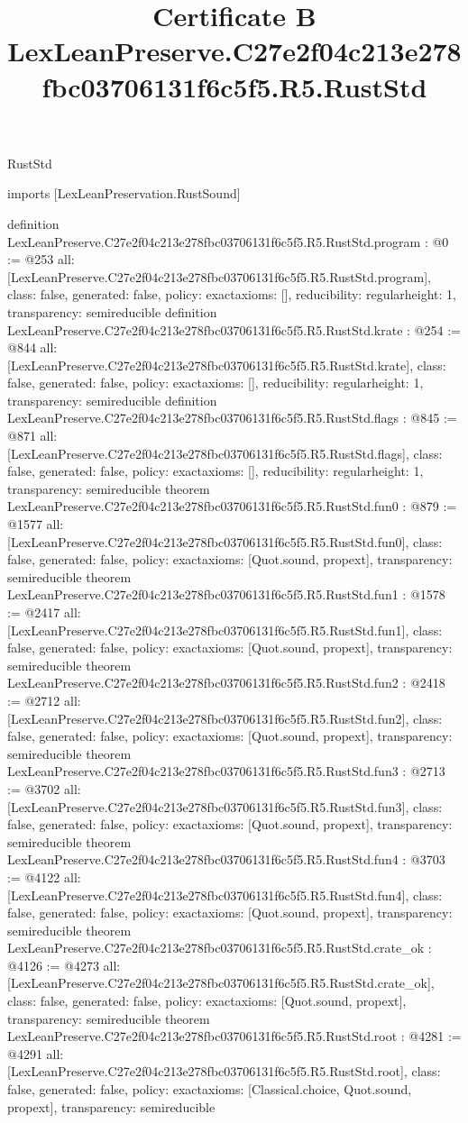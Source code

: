 \begin{lexlean}{RustStd}
\title{Certificate B LexLeanPreserve.C27e2f04c213e278fbc03706131f6c5f5.R5.RustStd}
\begin{coremodule}
imports [LexLeanPreservation.RustSound]

definition LexLeanPreserve.C27e2f04c213e278fbc03706131f6c5f5.R5.RustStd.program : @0 := @253 {
  all: [LexLeanPreserve.C27e2f04c213e278fbc03706131f6c5f5.R5.RustStd.program],
  class: false,
  generated: false,
  policy: exact{axioms: []},
  reducibility: regular{height: 1},
  transparency: semireducible
}
definition LexLeanPreserve.C27e2f04c213e278fbc03706131f6c5f5.R5.RustStd.krate : @254 := @844 {
  all: [LexLeanPreserve.C27e2f04c213e278fbc03706131f6c5f5.R5.RustStd.krate],
  class: false,
  generated: false,
  policy: exact{axioms: []},
  reducibility: regular{height: 1},
  transparency: semireducible
}
definition LexLeanPreserve.C27e2f04c213e278fbc03706131f6c5f5.R5.RustStd.flags : @845 := @871 {
  all: [LexLeanPreserve.C27e2f04c213e278fbc03706131f6c5f5.R5.RustStd.flags],
  class: false,
  generated: false,
  policy: exact{axioms: []},
  reducibility: regular{height: 1},
  transparency: semireducible
}
theorem LexLeanPreserve.C27e2f04c213e278fbc03706131f6c5f5.R5.RustStd.fun0 : @879 := @1577 {
  all: [LexLeanPreserve.C27e2f04c213e278fbc03706131f6c5f5.R5.RustStd.fun0],
  class: false,
  generated: false,
  policy: exact{axioms: [Quot.sound, propext]},
  transparency: semireducible
}
theorem LexLeanPreserve.C27e2f04c213e278fbc03706131f6c5f5.R5.RustStd.fun1 : @1578 := @2417 {
  all: [LexLeanPreserve.C27e2f04c213e278fbc03706131f6c5f5.R5.RustStd.fun1],
  class: false,
  generated: false,
  policy: exact{axioms: [Quot.sound, propext]},
  transparency: semireducible
}
theorem LexLeanPreserve.C27e2f04c213e278fbc03706131f6c5f5.R5.RustStd.fun2 : @2418 := @2712 {
  all: [LexLeanPreserve.C27e2f04c213e278fbc03706131f6c5f5.R5.RustStd.fun2],
  class: false,
  generated: false,
  policy: exact{axioms: [Quot.sound, propext]},
  transparency: semireducible
}
theorem LexLeanPreserve.C27e2f04c213e278fbc03706131f6c5f5.R5.RustStd.fun3 : @2713 := @3702 {
  all: [LexLeanPreserve.C27e2f04c213e278fbc03706131f6c5f5.R5.RustStd.fun3],
  class: false,
  generated: false,
  policy: exact{axioms: [Quot.sound, propext]},
  transparency: semireducible
}
theorem LexLeanPreserve.C27e2f04c213e278fbc03706131f6c5f5.R5.RustStd.fun4 : @3703 := @4122 {
  all: [LexLeanPreserve.C27e2f04c213e278fbc03706131f6c5f5.R5.RustStd.fun4],
  class: false,
  generated: false,
  policy: exact{axioms: [Quot.sound, propext]},
  transparency: semireducible
}
theorem LexLeanPreserve.C27e2f04c213e278fbc03706131f6c5f5.R5.RustStd.crate_ok : @4126 := @4273 {
  all: [LexLeanPreserve.C27e2f04c213e278fbc03706131f6c5f5.R5.RustStd.crate_ok],
  class: false,
  generated: false,
  policy: exact{axioms: [Quot.sound, propext]},
  transparency: semireducible
}
theorem LexLeanPreserve.C27e2f04c213e278fbc03706131f6c5f5.R5.RustStd.root : @4281 := @4291 {
  all: [LexLeanPreserve.C27e2f04c213e278fbc03706131f6c5f5.R5.RustStd.root],
  class: false,
  generated: false,
  policy: exact{axioms: [Classical.choice, Quot.sound, propext]},
  transparency: semireducible
}


\end{coremodule}
\end{lexlean}
